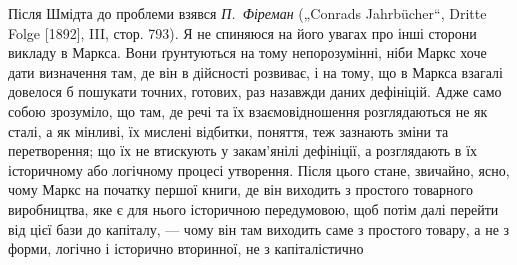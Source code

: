 Після Шмідта до проблеми взявся \emph{П.~Фіреман} („Conrads
Jahrbücher“, Dritte Folge [1892], III, стор. 793). Я не спиняюся на
його увагах про інші сторони викладу в Маркса. Вони ґрунтуються
на тому непорозумінні, ніби Маркс хоче дати визначення
там, де він в дійсності розвиває, і на тому, що в Маркса взагалі
довелося б пошукати точних, готових, раз назавжди даних
дефініцій. Адже само собою зрозуміло, що там, де речі та їх
взаємовідношення розглядаються не як сталі, а як мінливі, їх
мислені відбитки, поняття, теж зазнають зміни та перетворення;
що їх не втискують у закам’янілі дефініції, а розглядають в їх
історичному або логічному процесі утворення. Після цього стане,
звичайно, ясно, чому Маркс на початку першої книги, де він
виходить з простого товарного виробництва, яке є для нього
історичною передумовою, щоб потім далі перейти від цієї бази
до капіталу, — чому він там виходить саме з простого товару,
а не з форми, логічно і історично вторинної, не з капіталістично
\parbreak{}  %
